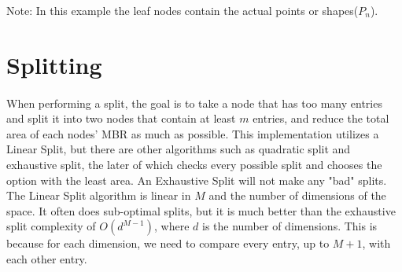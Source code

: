 \documentclass{article}
\begin{document}
\begin{multicols}{2}[]
\begin{minipage}{\linewidth}
\centering
{}

Note: In this example the leaf nodes contain the actual points or shapes($P_n$).
\end{minipage}



    


\section{Splitting} 

\paragraph{}
When performing a split, the goal is to take a node that has too many entries and split it into
two nodes that contain at least $m$ entries, and reduce the total area of each nodes' MBR as much as possible. This implementation utilizes a Linear Split, but there are other
algorithms such as quadratic split and exhaustive split, the later of which checks every
possible split and chooses the option with the least area. An Exhaustive Split
will not make any "bad" splits. The Linear Split algorithm
is linear in $M$ and the number of dimensions of the space. It often does sub-optimal
splits, but it is much better than the exhaustive split complexity of $O(d^{M-1})$, where
$d$ is the number of dimensions. This is because for each dimension, we need to compare every
entry, up to $M+1$, with each other entry.


\end{multicols}
\end{document}
